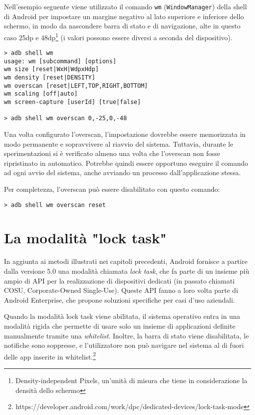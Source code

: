Nell'esempio seguente viene utilizzato il comando \texttt{wm} (\texttt{WindowManager}) della shell di Android per impostare un margine negativo al lato superiore e inferiore dello schermo, in modo da nascondere barra di stato e di navigazione, alte in questo caso 25dp e 48dp\footnote{Density-independent Pixels, un'unità di misura che tiene in considerazione la densità dello schermo} (i valori possono essere diversi a seconda del dispositivo).

\begin{verbatim}
> adb shell wm
usage: wm [subcommand] [options]
wm size [reset|WxH|WdpxHdp]
wm density [reset|DENSITY]
wm overscan [reset|LEFT,TOP,RIGHT,BOTTOM]
wm scaling [off|auto]
wm screen-capture [userId] [true|false]

> adb shell wm overscan 0,-25,0,-48
\end{verbatim}

Una volta configurato l'overscan, l'impostazione dovrebbe essere memorizzata in modo permanente e sopravvivere al riavvio del sistema. Tuttavia, durante le sperimentazioni si è verificato almeno una volta che l'overscan non fosse ripristinato in automatico. Potrebbe quindi essere opportuno eseguire il comando ad ogni avvio del sistema, anche avviando un processo dall'applicazione stessa.

Per completezza, l'overscan può essere disabilitato con questo comando:

\begin{verbatim}
> adb shell wm overscan reset
\end{verbatim}


\section{La modalità "lock task"}
\label{sec:kiosk_locktask}

In aggiunta ai metodi illustrati nei capitoli precedenti, Android fornisce a partire dalla versione 5.0 una modalità chiamata \emph{lock task}, che fa parte di un insieme più ampio di API per la realizzazione di dispositivi dedicati (in passato chiamati COSU, Corporate-Owned Single-Use). Queste API fanno a loro volta parte di Android Enterprise, che propone soluzioni specifiche per casi d'uso aziendali.

Quando la modalità lock task viene abilitata, il sistema operativo entra in una modalità rigida che permette di usare solo un insieme di applicazioni definite manualmente tramite una \emph{whitelist}. Inoltre, la barra di stato viene disabilitata, le notifiche sono soppresse, e l'utilizzatore non può navigare nel sistema al di fuori delle app inserite in whitelist.\footnote{https://developer.android.com/work/dpc/dedicated-devices/lock-task-mode}

